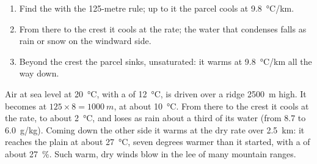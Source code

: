 \begin{method}\label{met:g10:why-clouds-form:mountain}
\begin{enumerate}
  \item Find the  with the 125-metre rule; up to it the
        parcel cools at \qty{9.8}{\degreeCelsius/km}.
  \item From there to the crest it cools at the  rate; the water
        that condenses falls as rain or snow on the windward side.
  \item Beyond the crest the parcel sinks, unsaturated: it warms at
        \qty{9.8}{\degreeCelsius/km} all the way down.
\end{enumerate}
\end{method}

\begin{example}\label{ex:g10:why-clouds-form:lee}
Air at sea level at \qty{20}{\degreeCelsius}, with a  of
\qty{12}{\degreeCelsius}, is driven over a ridge \qty{2500}{m} high. It
becomes  at $125 \times 8 = \qty{1000}{m}$, at about
\qty{10}{\degreeCelsius}. From there to the crest it cools at the 
rate, to about \qty{2}{\degreeCelsius}, and loses as rain about a third of
its water (from \num{8.7} to \qty{6.0}{g/kg}). Coming down the other side
it warms at the dry rate over \qty{2.5}{km}: it reaches the plain at about
\qty{27}{\degreeCelsius}, seven degrees warmer than it started, with a
 of about \qty{27}{\percent}. Such warm, dry winds blow in
the lee of many mountain ranges.
\end{example}

